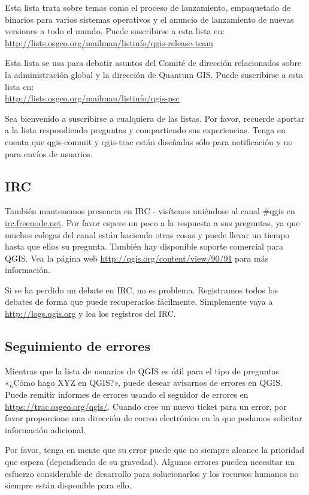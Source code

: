 Esta lista trata sobre temas como el proceso de lanzamiento, empaquetado de binarios para varios sistemas 
operativos y el anuncio de lanzamiento de nuevas versiones a todo el mundo. Puede suscribirse a esta lista en:\\
\url{http://lists.osgeo.org/mailman/listinfo/qgis-release-team}

Esta lista se usa para debatir asuntos del Comité de dirección relacionados sobre la administración global y la dirección de Quantum GIS. Puede suscribirse a esta lista en:\\
\url{http://lists.osgeo.org/mailman/listinfo/qgis-psc}

Sea bienvenido a suscribirse a cualquiera de las listas. Por favor, recuerde aportar a la lista respondiendo 
preguntas y compartiendo sus experiencias. Tenga en cuenta que qgis-commit y qgis-trac están diseñadas sólo 
para notificación y no para envíos de usuarios. 

\subsection{IRC}
También mantenemos presencia en IRC - visítenos uniéndose al canal \#qgis en
\url{irc.freenode.net}. 
Por favor espere un poco a la respuesta a sus preguntas, ya que muchos colegas del canal están haciendo otras 
cosas y puede llevar un tiempo hasta que ellos su pregunta. También hay disponible soporte comercial para QGIS.
Vea la página web \url{http://qgis.org/content/view/90/91} para más información.

Si se ha perdido un debate en IRC, no es problema. Registramos todos los debates de forma que puede 
recuperarlos fácilmente. Simplemente vaya a \url{http://logs.qgis.org} y lea los registros del IRC.

\subsection{Seguimiento de errores}
Mientras que la lista de usuarios de QGIS es útil para el tipo de preguntas «¿Cómo hago XYZ en QGIS?», puede 
desear avisarnos de errores en QGIS. Puede remitir informes de errores usando el seguidor de errores 
en \url{https://trac.osgeo.org/qgis/}. 
Cuando cree un nuevo ticket para un error, por favor proporcione una dirección de correo electrónico en la 
que podamos solicitar información adicional. 

Por favor, tenga en mente que su error puede que no siempre alcance la prioridad que espera (dependiendo de su 
gravedad). Algunos errores pueden necesitar un esfuerzo considerable de desarrollo para solucionarlos y los 
recursos humanos no siempre están disponible para ello.

